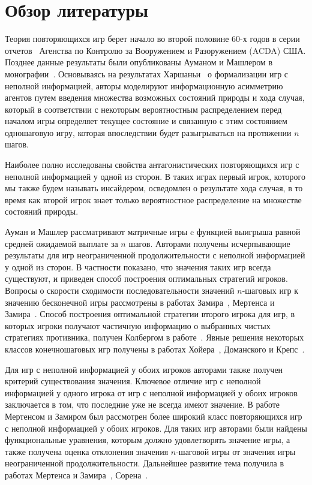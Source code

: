 \chapter*{Обзор литературы}

Теория повторяющихся игр берет начало во второй половине 60-х годов в серии отчетов~\cite{r:aumann66, r:aumann67, r:aumann68a, r:aumann68b, r:stearns67} Агенства по Контролю за Вооружением и Разоружением (ACDA) США.
Позднее данные результаты были опубликованы Ауманом и Машлером в монографии~\cite{aumann95}.
Основываясь на результатах Харшаньи~\cite{harsanyi67} о формализации игр с неполной информацией, авторы моделируют информационную асимметрию агентов путем введения множества возможных состояний природы и хода случая, который в соответствии с некоторым вероятностным распределением перед началом игры определяет текущее состояние и связанную с этим состоянием одношаговую игру, которая впоследствии будет разыгрываться на протяжении $n$ шагов.

Наиболее полно исследованы свойства антагонистических повторяющихся игр с неполной информацией у одной из сторон.
В таких играх первый игрок, которого мы также будем называть инсайдером, осведомлен о результате хода случая, в то время как второй игрок знает только вероятностное распределение на множестве состояний природы.

Ауман и Машлер рассматривают матричные игры c функцией выигрыша равной средней ожидаемой выплате за $n$ шагов.
Авторами получены исчерпывающие результаты для игр неограниченной продолжительности с неполной информацией у одной из сторон.
В частности показано, что значения таких игр всегда существуют, и приведен способ построения оптимальных стратегий игроков.
%
Вопросы о скорости сходимости последовательности значений $n$-шаговых игр к значению бесконечной игры рассмотрены в работах Замира~\cite{zamir71}, Мертенса и Замира~\cite{mertens76,mertens77}.
%
Способ построения оптимальной стратегии второго игрока для игр, в которых игроки получают частичную информацию о выбранных чистых стратегиях противника, получен Колбергом в работе~\cite{kohlberg75}.
%
Явные решения некоторых классов конечношаговых игр получены в работах Хойера~\cite{heuer91}, Доманского и Крепс~\cite{domansky94,domansky95,domansky99}.

Для игр с неполной информацией у обоих игроков авторами также получен критерий существования значения.
Ключевое отличие игр с неполной информацией у одного игрока от игр с неполной информацией у обоих игроков заключается в том, что последние уже не всегда имеют значение.
В работе~\cite{mertens71} Мертенсом и Замиром был рассмотрен более широкий класс повторяющихся игр с неполной информацией у обоих игроков.
Для таких игр авторами были найдены функциональные уравнения, которым должно удовлетворять значение игры, а также получена оценка отклонения значения $n$-шаговой игры от значения игры неограниченной продолжительности.
Дальнейшее развитие тема получила в работах Мертенса и Замира~\cite{mertens77}, Сорена~\cite{sorin84}.

